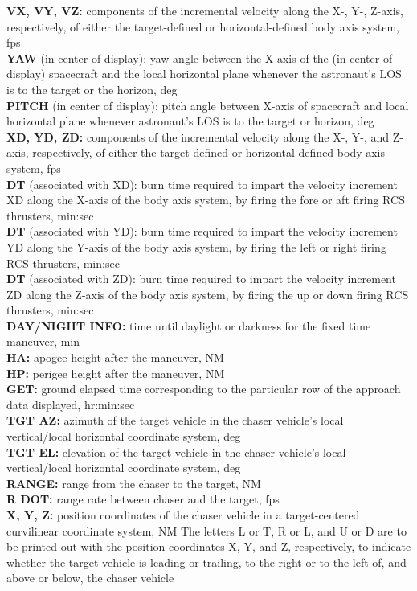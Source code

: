 \documentclass[11pt]{article} %
\begin{document}
\textbf{VX, VY, VZ:} components of the incremental velocity along the X-, Y-, Z-axis, respectively, of either the target-defined or horizontal-defined body axis system, fps\\
\textbf{YAW} (in center of display): yaw angle between the X-axis of the (in center of display) spacecraft and the local horizontal
plane whenever the astronaut's LOS is to the target or the horizon, deg\\
\textbf{PITCH} (in center of display): pitch angle between X-axis of spacecraft and local horizontal plane whenever astronaut's LOS is to the target or horizon, deg\\
\textbf{XD, YD, ZD:} components of the incremental velocity along the X-, Y-, and Z-axis, respectively, of either the target-defined or horizontal-defined body axis system, fps\\
\textbf{DT} (associated with XD): burn time required to impart the velocity increment XD along the X-axis of the body axis system, by firing the fore or aft firing RCS thrusters, min:sec\\
\textbf{DT} (associated with YD): burn time required to impart the velocity increment YD along the Y-axis of the body axis system, by firing the left or right firing RCS thrusters, min:sec\\
\textbf{DT} (associated with ZD): burn time required to impart the velocity increment ZD along the Z-axis of the body axis system, by firing the up or down firing RCS thrusters, min:sec\\
\textbf{DAY/NIGHT INFO:} time until daylight or darkness for the fixed time maneuver, min\\
\textbf{HA:} apogee height after the maneuver, NM\\
\textbf{HP:} perigee height after the maneuver, NM\\
\textbf{GET:} ground elapsed time corresponding to the particular row of the approach data displayed, hr:min:sec\\
\textbf{TGT AZ:} azimuth of the target vehicle in the chaser vehicle's local vertical/local horizontal coordinate system, deg\\
\textbf{TGT EL:} elevation of the target vehicle in the chaser vehicle's local vertical/local horizontal coordinate system, deg\\
\textbf{RANGE:} range from the chaser to the target, NM\\
\textbf{R DOT:} range rate between chaser and the target, fps\\
\textbf{X, Y, Z:} position coordinates of the chaser vehicle in a target-centered curvilinear coordinate system, NM The letters L or T, R or L, and U or D are to be printed out with the position coordinates X, Y, and Z, respectively, to indicate whether the target vehicle is leading or trailing, to the right or to the left of, and above or below, the chaser vehicle\\
\newpage
\end{document}

